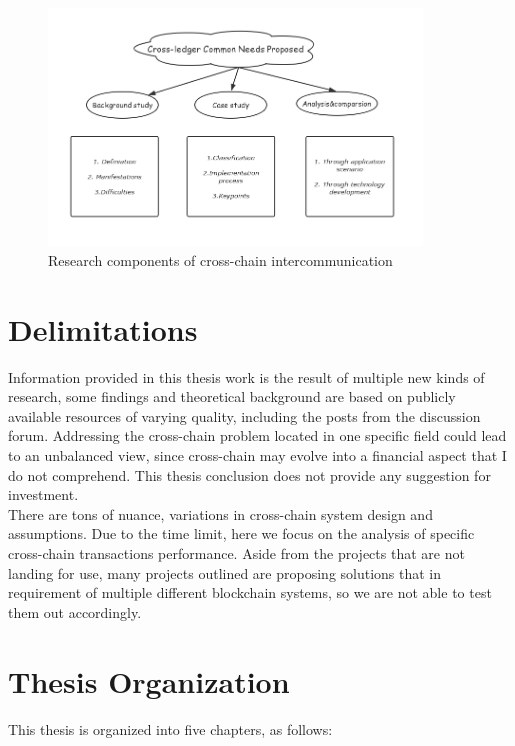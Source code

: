     \begin{figure}[H]
    \includegraphics[width=0.8854\textwidth]{./figures/contri.png}
    \centering
    \caption{Research components of cross-chain intercommunication}%
    \centering
    \label{fig:contri}
    \end{figure}


\section{Delimitations}
\label{sec:d}
\noindent Information provided in this thesis work is the result of multiple new kinds of research, some findings and theoretical background are based on publicly available resources of varying quality, including the posts from the discussion forum. Addressing the cross-chain problem located in one specific field could lead to an unbalanced view, since cross-chain may evolve into a financial aspect that I do not comprehend. This thesis conclusion does not provide any suggestion for investment.\\

\noindent There are tons of nuance, variations in cross-chain system design and assumptions. Due to the time limit, here we focus on the analysis of specific cross-chain transactions performance. Aside from the projects that are not landing for use, many projects outlined are proposing solutions that in requirement of multiple different blockchain systems, so we are not able to test them out accordingly.

\section{Thesis Organization}
\label{sec:to}
This thesis is organized into five chapters, as follows:


